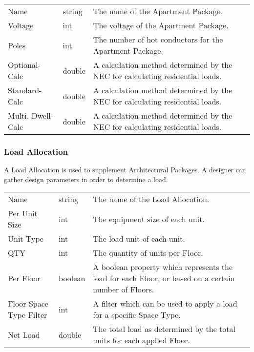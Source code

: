 \documentclass[letterpaper,10pt,english]{sphinxmanual}
\begin{document}
\begin{savenotes}\sphinxattablestart
\centering
\begin{tabulary}{\linewidth}[t]{|T|T|T|}
\hline
\sphinxstyletheadfamily 
{}
&\sphinxstyletheadfamily 
{}
&\sphinxstyletheadfamily 
{}
\\
\hline
Name
&
string
&
The name of the Apartment Package.
\\
\hline
Voltage
&
int
&
The voltage of the Apartment Package.
\\
\hline
Poles
&
int
&
The number of hot conductors for the Apartment Package.
\\
\hline
Optional-Calc
&
double
&
A calculation method determined by the NEC for calculating residential loads.
\\
\hline
Standard-Calc
&
double
&
A calculation method determined by the NEC for calculating residential loads.
\\
\hline
Multi. Dwell-Calc
&
double
&
A calculation method determined by the NEC for calculating residential loads.
\\
\hline
\end{tabulary}
\par
\sphinxattableend\end{savenotes}


\subsubsection{Load Allocation}
\label{\detokenize{docs/definitions/index-definitions:load-allocation}}\label{\detokenize{docs/definitions/index-definitions:load-allocation-definition}}
A Load Allocation is used to supplement Architectural Packages.  A designer can gather design parameters in order to determine a load.


\begin{savenotes}\sphinxattablestart
\centering
\begin{tabulary}{\linewidth}[t]{|T|T|T|}
\hline
\sphinxstyletheadfamily 
{}
&\sphinxstyletheadfamily 
{}
&\sphinxstyletheadfamily 
{}
\\
\hline
Name
&
string
&
The name of the Load Allocation.
\\
\hline
Per Unit Size
&
int
&
The equipment size of each unit.
\\
\hline
Unit Type
&
int
&
The load unit of each unit.
\\
\hline
QTY
&
int
&
The quantity of units per Floor.
\\
\hline
Per Floor
&
boolean
&
A boolean property which represents the load for each Floor, or based on a certain number of Floors.
\\
\hline
Floor Space Type Filter
&
int
&
A filter which can be used to apply a load for a specific Space Type.
\\
\hline
Net Load
&
double
&
The total load as determined by the total units for each applied Floor.
\\
\hline
\end{tabulary}
\par
\sphinxattableend\end{savenotes}
\end{document}
